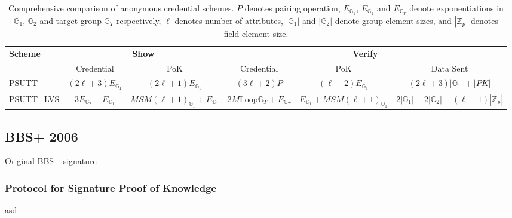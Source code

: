 \begin{table}[ht]
\centering
\begin{tabular}{l|cc|ccc}
\toprule
\multirow{2}{*}{\textbf{Scheme}} & \multicolumn{2}{c|}{\textbf{Show}} & \multicolumn{3}{c}{\textbf{Verify}} \\
\cmidrule(lr){2-3} \cmidrule(lr){4-6}
& Credential & PoK & Credential & PoK & Data Sent \\
\midrule
PSUTT & $(2\ell + 3)E_{\mathbb{G}_1}$ & $(2\ell + 1)E_{\mathbb{G}_1}$ & $(3\ell + 2)P$ & $(\ell + 2)E_{\mathbb{G}_1}$ & $(2\ell + 3)|\mathbb{G}_1| + |PK|$ \\
PSUTT+LVS & $3E_{\mathbb{G}_2} + E_{\mathbb{G}_1}$ & $MSM(\ell + 1)_{\mathbb{G}_1} + E_{\mathbb{G}_1}$ & $2M\text{Loop}\mathbb{G}_T + E_{\mathbb{G}_T}$ & $E_{\mathbb{G}_1} + MSM(\ell + 1)_{\mathbb{G}_1}$ & $2|\mathbb{G}_1| + 2|\mathbb{G}_2| + (\ell + 1)|\mathbb{Z}_p|$ \\
\bottomrule
\end{tabular}
\caption{Comprehensive comparison of anonymous credential schemes. $P$ denotes pairing operation, $E_{\mathbb{G}_1}$, $E_{\mathbb{G}_2}$ and $E_{\mathbb{G}_T}$ denote exponentiations in $\mathbb{G}_1$, $\mathbb{G}_2$ and target group $\mathbb{G}_T$ respectively, $\ell$ denotes number of attributes, $|\mathbb{G}_1|$ and $|\mathbb{G}_2|$ denote group element sizes, and $|\mathbb{Z}_p|$ denotes field element size.}
\label{tab:unified-comparison}
\end{table}
















% 
% 

\newpage
\subsection{BBS+ 2006}
Original BBS+ signature
\subsubsection{Protocol for Signature Proof of Knowledge}
asd

